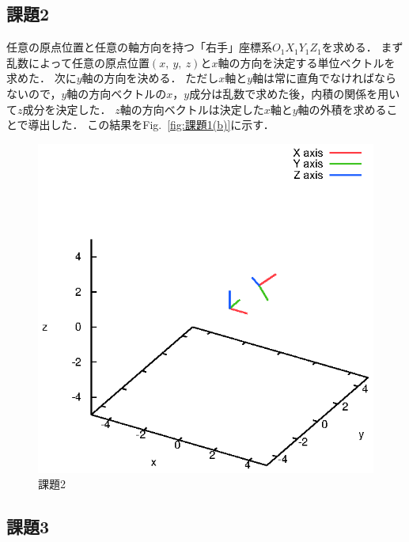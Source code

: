 \documentclass[a4paper,10pt]{jsarticle}
\begin{document}
\subsection{課題2}
任意の原点位置と任意の軸方向を持つ「右手」座標系$O_1X_1Y_1Z_1$を求める．
まず乱数によって任意の原点位置$(x,\ y,\ z)$と$x$軸の方向を決定する単位ベクトルを求めた．
次に$y$軸の方向を決める．
ただし$x$軸と$y$軸は常に直角でなければならないので，$y$軸の方向ベクトルの$x$，$y$成分は乱数で求めた後，内積の関係を用いて$z$成分を決定した．
$z$軸の方向ベクトルは決定した$x$軸と$y$軸の外積を求めることで導出した．
この結果をFig.~\ref{fig:課題1(b)}に示す．

\begin{figure}[htb]
  \begin{center}
    \includegraphics[clip,width=14cm]{fig/eps/2.eps}
  \end{center}
  \caption{課題2}
  \label{fig:課題2}
\end{figure}

\subsection{課題3}
\end{document}
